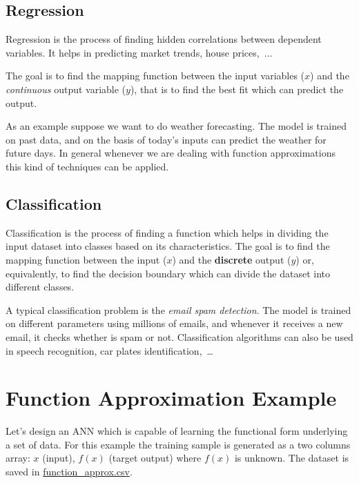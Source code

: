 \subsection{Regression}
\label{regression}

Regression is the process of finding hidden correlations between dependent variables. It helps in predicting market trends, house prices,~$\ldots$

The goal is to find the mapping function between the input variables ($x$) and the \emph{continuous} output variable ($y$), that is to find the best fit which can predict the output.

As an example suppose we want to do weather forecasting. The model is trained on past data, and on the basis of today's inputs can predict the weather for future days. In general whenever we are dealing with function approximations this kind of techniques can be applied.

\subsection{Classification}
\label{classification}

Classification is the process of finding a function which helps in dividing the input dataset into classes based on its characteristics. The goal is to find the mapping function between the input ($x$) and the \textbf{discrete} output ($y$) or, equivalently, to find the decision boundary which can divide the dataset into different classes.

A typical classification problem is the \emph{email spam detection}. The model is trained on different parameters using millions of emails, and whenever it receives a new email, it checks whether is spam or not. Classification algorithms can also be used in speech recognition, car plates identification,~\ldots

\section{Function Approximation Example}
\label{function-approximation}

Let's design an ANN which is capable of learning the functional form underlying a set of data. For this example the training sample is generated as a two columns array: $x$ (input), $f(x)$ (target output) where $f(x)$ is unknown. The dataset is saved in \href{https://raw.githubusercontent.com/matteosan1/finance_course/refs/heads/develop/input_files/function_approx.csv}{function\_approx.csv}. 

